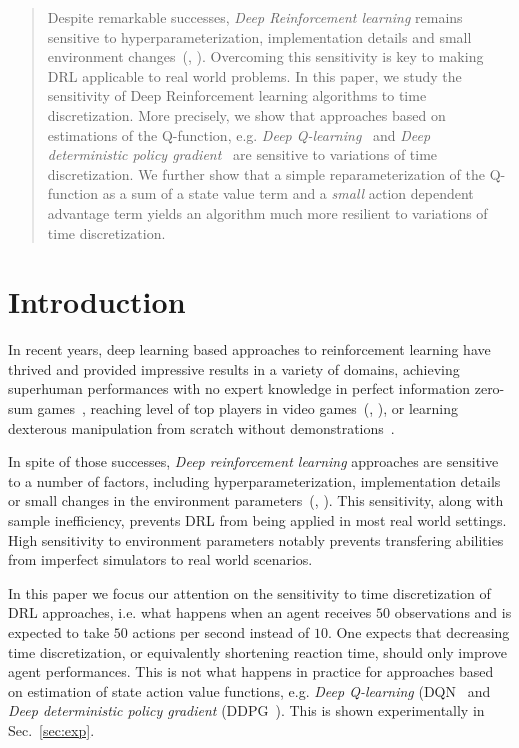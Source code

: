 \documentclass{article}
\begin{document}

\begin{abstract}
	Despite remarkable successes, \emph{Deep Reinforcement learning} remains sensitive to
	hyperparameterization, implementation details and small environment changes~(\citealt{drl_matter}, \citealt{drl_matter_bis}). 
	Overcoming this sensitivity is key to making DRL applicable to real world problems.
	In this paper, we study the sensitivity of Deep Reinforcement learning algorithms to
	time discretization. More precisely, we show that approaches based on estimations of the
	Q-function, e.g. \emph{Deep Q-learning}~\cite{dqn} and \emph{Deep deterministic policy gradient}~\cite{ddpg}
	are sensitive to variations of time discretization. We further show that a simple reparameterization of the
	Q-function as a sum of a state value term and a \emph{small} action dependent advantage term yields an algorithm
	much more resilient to variations of time discretization.
\end{abstract}

\section{Introduction}
\label{sec:intro}
In recent years, deep learning based approaches to reinforcement learning have
thrived and provided impressive results in a variety of domains, achieving superhuman
performances with no expert knowledge in perfect information zero-sum
games~\cite{alphazero}, reaching level of top players in video
games~(\citealt{openai_five}, \citealt{dqn}), or learning dexterous manipulation
from scratch without demonstrations~\cite{hand_control}.

In spite of those successes, \emph{Deep reinforcement learning} approaches are
sensitive to a number of factors, including hyperparameterization,
implementation details or small changes in the environment
parameters~(\citealt{drl_matter}, \citealt{drl_matter_bis}). This sensitivity,
along with sample inefficiency, prevents DRL from being applied in most real
world settings. High sensitivity to environment parameters notably prevents
transfering abilities from imperfect simulators to real world scenarios.

In this paper we focus our attention on the sensitivity to time discretization
of DRL approaches, i.e. what happens when an agent receives $50$ observations
and is expected to take $50$ actions per second instead of $10$. One expects
that decreasing time discretization, or equivalently shortening reaction time,
should only improve agent performances. This is not what happens in practice
for approaches based on estimation of state action value functions, e.g.
\emph{Deep Q-learning} (DQN~\citep{dqn} and \emph{Deep deterministic policy
gradient} (DDPG~\citep{ddpg}). This is shown experimentally in Sec.~\ref{sec:exp}.
\end{document}
